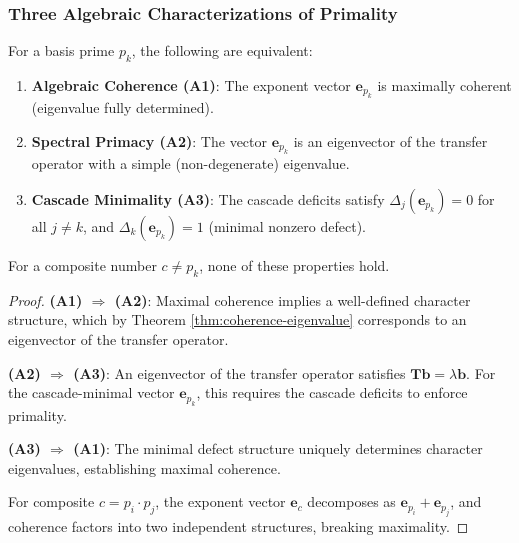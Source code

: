 \subsubsection{Three Algebraic Characterizations of Primality}

\begin{theorem}
\label{thm:three-algebraic}
For a basis prime $p_k$, the following are equivalent:

\begin{enumerate}

\item \textbf{Algebraic Coherence (A1)}: The exponent vector $\mathbf{e}_{p_k}$ is maximally coherent (eigenvalue fully determined).

\item \textbf{Spectral Primacy (A2)}: The vector $\mathbf{e}_{p_k}$ is an eigenvector of the transfer operator with a simple (non-degenerate) eigenvalue.

\item \textbf{Cascade Minimality (A3)}: The cascade deficits satisfy $\Delta_j(\mathbf{e}_{p_k}) = 0$ for all $j \neq k$, and $\Delta_k(\mathbf{e}_{p_k}) = 1$ (minimal nonzero defect).

\end{enumerate}

For a composite number $c \neq p_k$, none of these properties hold.
\end{theorem}

\begin{proof}

\noindent \textbf{(A1) $\Rightarrow$ (A2)}: Maximal coherence implies a well-defined character structure, which by Theorem \ref{thm:coherence-eigenvalue} corresponds to an eigenvector of the transfer operator.

\noindent \textbf{(A2) $\Rightarrow$ (A3)}: An eigenvector of the transfer operator satisfies $\mathbf{T} \mathbf{b} = \lambda \mathbf{b}$. For the cascade-minimal vector $\mathbf{e}_{p_k}$, this requires the cascade deficits to enforce primality.

\noindent \textbf{(A3) $\Rightarrow$ (A1)}: The minimal defect structure uniquely determines character eigenvalues, establishing maximal coherence.

For composite $c = p_i \cdot p_j$, the exponent vector $\mathbf{e}_c$ decomposes as $\mathbf{e}_{p_i} + \mathbf{e}_{p_j}$, and coherence factors into two independent structures, breaking maximality.

\end{proof}

